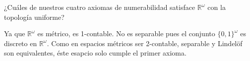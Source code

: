 
   \item ¿Cuáles de nuestros cuatro axiomas de numerabilidad satisface $\mathbb{R}^{\omega}$ con la topología uniforme?
   
      Ya que $\mathbb{R}^{\omega}$ es métrico, es 1-contable. No es separable pues el conjunto $\{0,1\}^\omega$ es discreto en $\mathbb{R}^\omega$. Como en espacios métricos ser 2-contable, separable y Lindelöf son equivalentes, éste esapcio solo cumple el primer axioma.